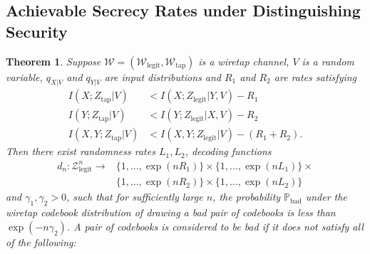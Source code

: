 \documentclass[journal]{IEEEtran}
\newcommand{\channelpmf}{q}
\newcommand{\codebookRateOne}{R_1}
\newcommand{\codebookRateTwo}{R_2}
\newcommand{\channelInOne}{X}
\newcommand{\channelInTwo}{Y}
\newcommand{\channelOut}{Z}
\newcommand{\channelOutAlph}{\mathcal{Z}}
\newcommand{\channel}{\mathcal{W}}
\newcommand{\channelWiretapper}{{\channel_\mathrm{tap}}}
\newcommand{\channelLegit}{{\channel_\mathrm{legit}}}
\newcommand{\channelOutAlphLegit}{\channelOutAlph_\mathrm{legit}}
\newcommand{\channelOutWiretapper}{\channelOut_\mathrm{tap}}
\newcommand{\channelOutLegit}{\channelOut_\mathrm{legit}}
\newcommand{\codebookBlocklength}{n}
\newcommand{\mutualInformationConditional}[3]{I(#1;#2|#3)}
\newcommand{\finalconstOne}{\gamma_1}
\newcommand{\finalconstTwo}{\gamma_2}
\newcommand{\Probability}{\mathbb{P}}
\newcommand{\codebookDecoder}{d}
\newcommand{\codebookRandRateOne}{{L_1}}
\newcommand{\codebookRandRateTwo}{{L_2}}
\newcommand{\timeSharingRV}{V}
\newtheorem{theorem}{Theorem}
\begin{document}
\subsection{Achievable Secrecy Rates under Distinguishing Security}
\label{sec:secrecy-achieve}
\begin{theorem}
\label{theorem:distinguishing-security}
Suppose $\channel = (\channelLegit, \channelWiretapper)$ is a wiretap channel, $\timeSharingRV$ is a random variable, $\channelpmf_{\channelInOne|\timeSharingRV}$ and $\channelpmf_{\channelInTwo|\timeSharingRV}$ are input distributions and $\codebookRateOne$ and $\codebookRateTwo$ are rates satisfying
\begin{align}
\label{theorem:distinguishing-security-rate-one}
\mutualInformationConditional{\channelInOne}{\channelOutWiretapper}{\timeSharingRV}
&<
\mutualInformationConditional{\channelInOne}{\channelOutLegit}{\channelInTwo,\timeSharingRV}
-
\codebookRateOne
\\
\label{theorem:distinguishing-security-rate-two}
\mutualInformationConditional{\channelInTwo}{\channelOutWiretapper}{\timeSharingRV}
&<
\mutualInformationConditional{\channelInTwo}{\channelOutLegit}{\channelInOne,\timeSharingRV}
-
\codebookRateTwo
\\
\label{theorem:distinguishing-security-rate-both}
\mutualInformationConditional{\channelInOne,\channelInTwo}{\channelOutWiretapper}{\timeSharingRV}
&<
\mutualInformationConditional{\channelInOne,\channelInTwo}{\channelOutLegit}{\timeSharingRV}
-
(\codebookRateOne+\codebookRateTwo).
\end{align}
Then there exist randomness rates $\codebookRandRateOne, \codebookRandRateTwo$, decoding functions
\begin{align*}
\codebookDecoder_\codebookBlocklength: \channelOutAlphLegit^\codebookBlocklength \rightarrow
  &\{1,\dots,\exp(\codebookBlocklength\codebookRateOne)\} \times \{1, \dots, \exp(\codebookBlocklength\codebookRandRateOne)\} \times \\
  &\{1,\dots,\exp(\codebookBlocklength\codebookRateTwo)\} \times \{1, \dots, \exp(\codebookBlocklength\codebookRandRateTwo)\}
\end{align*}
and $\finalconstOne, \finalconstTwo > 0$, such that for sufficiently large $\codebookBlocklength$, the probability $\Probability_\mathrm{bad}$ under the wiretap codebook distribution of drawing a bad pair of codebooks is less than $\exp(-\codebookBlocklength\finalconstTwo)$. A pair of codebooks is considered to be bad if it does not satisfy all of the following:
\begin{enumerate}

\end{enumerate}
\end{theorem}
\end{document}
